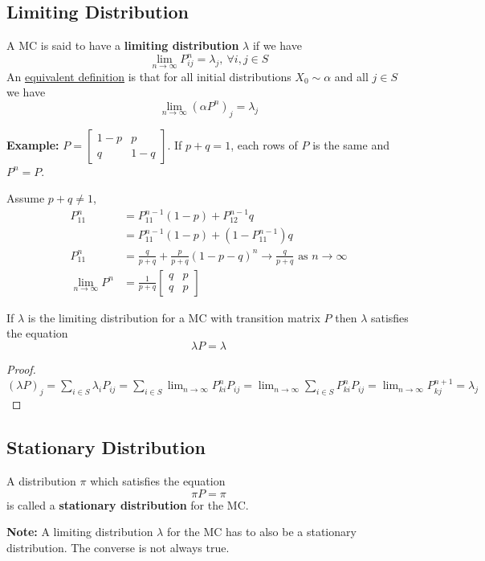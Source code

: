 \documentclass[11pt]{elegantbook}
\begin{document}
\subsection{Limiting Distribution}
\begin{definition}
    A MC is said to have a \textbf{limiting distribution} $\lambda$ if we have $$\lim_{n \rightarrow \infty}P_{ij}^n=\lambda_j,\ \forall i,j\in S$$
    An \underline{equivalent definition} is that for all initial distributions $X_0\sim \alpha$ and all $j\in S$ we have
    $$\lim_{n \rightarrow \infty}(\alpha P^n)_j=\lambda_j$$
\end{definition}

\textbf{Example: }$P=\begin{bmatrix}
    1-p&p\\
    q&1-q
\end{bmatrix}$. If $p+q=1$, each rows of $P$ is the same and $P^n=P$.

Assume $p+q\neq 1$,
\begin{equation}
    \begin{aligned}
        P^n_{11}&=P^{n-1}_{11}(1-p)+P^{n-1}_{12}q\\&=P^{n-1}_{11}(1-p)+(1-P^{n-1}_{11})q\\
        P^n_{11}&=\frac{q}{p+q}+\frac{p}{p+q}(1-p-q)^n \rightarrow \frac{q}{p+q}\text{ as }n \rightarrow \infty\\
        \lim_{n \rightarrow \infty}P^n&=\frac{1}{p+q}\begin{bmatrix}
            q&p\\
            q&p
        \end{bmatrix}
    \end{aligned}
    \nonumber
\end{equation}

\begin{lemma}
    If $\lambda$ is the limiting distribution for a MC with transition matrix $P$ then $\lambda$ satisfies the equation $$\lambda P=\lambda$$
\end{lemma}
\begin{proof}
    $(\lambda P)_j=\sum_{i\in S}\lambda_i P_{ij}=\sum_{i\in S}\lim_{n \rightarrow \infty}P_{ki}^nP_{ij}=\lim_{n \rightarrow \infty}\sum_{i\in S}P_{ki}^nP_{ij}=\lim_{n \rightarrow \infty}P_{kj}^{n+1}=\lambda_j$
\end{proof}

\subsection{Stationary Distribution}
\begin{definition}
    A distribution $\pi$ which satisfies the equation $$\pi P=\pi$$ is called a \textbf{stationary distribution} for the MC.
\end{definition}
\textbf{Note: }A limiting distribution $\lambda$ for the MC has to also be a stationary distribution. The converse is not always true.
\end{document}
